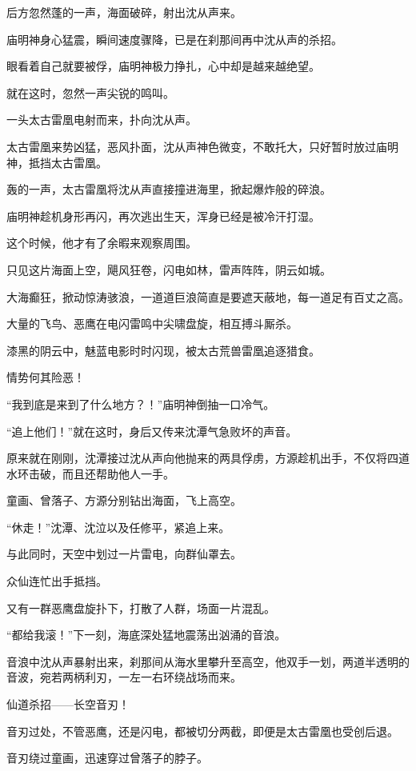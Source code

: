 \begin{this_body}
后方忽然蓬的一声，海面破碎，射出沈从声来。

庙明神身心猛震，瞬间速度骤降，已是在刹那间再中沈从声的杀招。

眼看着自己就要被俘，庙明神极力挣扎，心中却是越来越绝望。

就在这时，忽然一声尖锐的鸣叫。

一头太古雷凰电射而来，扑向沈从声。

太古雷凰来势凶猛，恶风扑面，沈从声神色微变，不敢托大，只好暂时放过庙明神，抵挡太古雷凰。

轰的一声，太古雷凰将沈从声直接撞进海里，掀起爆炸般的碎浪。

庙明神趁机身形再闪，再次逃出生天，浑身已经是被冷汗打湿。

这个时候，他才有了余暇来观察周围。

只见这片海面上空，飓风狂卷，闪电如林，雷声阵阵，阴云如城。

大海癫狂，掀动惊涛骇浪，一道道巨浪简直是要遮天蔽地，每一道足有百丈之高。

大量的飞鸟、恶鹰在电闪雷鸣中尖啸盘旋，相互搏斗厮杀。

漆黑的阴云中，魅蓝电影时时闪现，被太古荒兽雷凰追逐猎食。

情势何其险恶！

“我到底是来到了什么地方？！”庙明神倒抽一口冷气。

“追上他们！”就在这时，身后又传来沈潭气急败坏的声音。

原来就在刚刚，沈潭接过沈从声向他抛来的两具俘虏，方源趁机出手，不仅将四道水环击破，而且还帮助他人一手。

童画、曾落子、方源分别钻出海面，飞上高空。

“休走！”沈潭、沈泣以及任修平，紧追上来。

与此同时，天空中划过一片雷电，向群仙罩去。

众仙连忙出手抵挡。

又有一群恶鹰盘旋扑下，打散了人群，场面一片混乱。

“都给我滚！”下一刻，海底深处猛地震荡出汹涌的音浪。

音浪中沈从声暴射出来，刹那间从海水里攀升至高空，他双手一划，两道半透明的音波，宛若两柄利刃，一左一右环绕战场而来。

仙道杀招——长空音刃！

音刃过处，不管恶鹰，还是闪电，都被切分两截，即便是太古雷凰也受创后退。

音刃绕过童画，迅速穿过曾落子的脖子。


\end{this_body}
